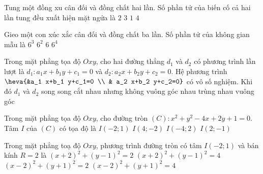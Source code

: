 \begin{ex}%
	Tung một đồng xu cân đối và đồng chất hai lần. Số phần tử của biến cố cả hai lần tung đều xuất hiện mặt ngửa là
	\choice
	{$2$}
	{$3$}
	{\True $1$}
	{$4$}
\end{ex}
\begin{ex}%
	Gieo một con xúc xắc cân đối và đồng chất ba lần. Số phần tử của không gian mẫu là
	\choice
	{\True $6^3$}
	{$6^2$}
	{$6$}
	{$6^4$}
\end{ex}
\begin{ex}%
	Trong mặt phẳng tọa độ $Oxy$, cho hai đường thẳng $d_1$ và $d_2$ có phương trình lần lượt là $d_1\colon a_1x+b_1y+c_1=0$ và $d_2\colon a_2x+b_2y+c_2=0$. Hệ phương trình $\heva{&a_1 x+b_1 y+c_1=0 \\ & a_2 x+b_2 y+c_2=0}$ có vô số nghiệm. Khi đó $d_1$ và $d_2$
	\choice
	{song song}
	{cắt nhau nhưng không vuông góc nhau}
	{\True trùng nhau}
	{vuông góc}
\end{ex}
\begin{ex}%
	Trong mặt phẳng tọa độ $Oxy$, cho đường tròn $(C)\colon x^2+y^2-4x+2y+1=0$. Tâm $I$ của $(C)$ có tọa độ là
	\choice
	{$I(-2 ; 1)$}
	{$I(4 ;-2)$}
	{$I(-4 ; 2)$}
	{\True $I(2 ;-1)$}
\end{ex}
\begin{ex}%
	Trong mặt phẳng toạ độ $Oxy$, phương trình đường tròn có tâm $I(-2; 1)$ và bán kính $R=2$ là
	\choice
	{$(x+2)^2+(y-1)^2=2$}
	{\True $(x+2)^2+(y-1)^2=4$}
	{$(x-2)^2+(y+1)^2=2$}
	{$(x-2)^2+(y+1)^2=4$}
\end{ex}

